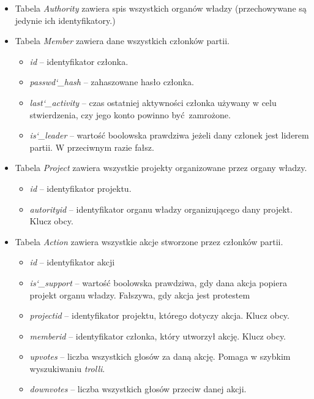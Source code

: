 \documentclass[12pt]{article}
\begin{document}
\begin{itemize}
    \item{Tabela \textit{Authority} zawiera spis wszystkich organów władzy
          (przechowywane są jedynie ich identyfikatory.)}
    \item{Tabela \textit{Member} zawiera dane wszystkich członków partii.}
    \begin{itemize}
        \item{\textit{id} -- identyfikator członka.}
        \item{\textit{passwd\char`_hash} -- zahaszowane hasło członka.}
        \item{\textit{last\char`_activity} -- czas ostatniej aktywności członka
              używany w celu stwierdzenia, czy jego konto powinno być zamrożone.}
        \item{\textit{is\char`_leader} -- wartość boolowska prawdziwa jeżeli
              dany członek jest liderem partii. W przeciwnym razie fałsz.}
    \end{itemize}
    \item{Tabela \textit{Project} zawiera wszystkie projekty organizowane
          przez organy władzy.}
    \begin{itemize}
        \item{\textit{id} -- identyfikator projektu.}
        \item{\textit{autorityid} -- identyfikator organu władzy organizującego
              dany projekt. Klucz obcy.}
    \end{itemize}
    \item{Tabela \textit{Action} zawiera wszystkie akcje stworzone przez członków
          partii.}
    \begin{itemize}
        \item{\textit{id} -- identyfikator akcji}
        \item{\textit{is\char`_support} -- wartość boolowska prawdziwa, 
              gdy dana akcja popiera projekt organu władzy. 
              Fałszywa, gdy akcja jest protestem}
        \item{\textit{projectid} -- identyfikator projektu, którego dotyczy 
              akcja. Klucz obcy.}
        \item{\textit{memberid} -- identyfikator członka, który utworzył akcję.
              Klucz obcy.}
        \item{\textit{upvotes} -- liczba wszystkich głosów za daną akcję. Pomaga
              w szybkim wyszukiwaniu \textit{trolli}.}
        \item{\textit{downvotes} -- liczba wszystkich głosów przeciw danej akcji. 
}
\end{itemize}
\end{itemize}
\end{document}
